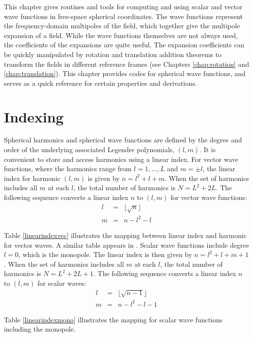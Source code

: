 

This chapter gives routines and tools for computing and using scalar and vector wave functions in free-space spherical coordinates. The wave functions represent the frequency-domain multipoles of the field, which together give the multipole expansion of a field. While the wave functions themselves are not always used, the coefficients of the expansions are quite useful. The expansion coefficients can be quickly manipulated by rotation and translation addition theorems to transform the fields in different reference frames (see Chapters \ref{chap:rotation} and \ref{chap:translation}). This chapter provides codes for spherical wave functions, and serves as a quick reference for certain properties and derivations. 

\section{Indexing}

Spherical harmonics and spherical wave functions are defined by the degree and order of the underlying associated Legendre polynomials, $(l,m)$. It is convenient to store and access harmonics using a linear index. For vector wave functions, where the harmonics range from $l = 1,...,L$ and $m = \pm l$, the linear index for harmonic $(l,m)$ is given by $n = l^2 + l + m$. When the set of harmonics includes all $m$ at each $l$, the total number of harmonics is $N = L^2 + 2L$. The following sequence converts a linear index $n$ to $(l,m)$ for vector wave functions:
\begin{eqnarray}
l &=& \lfloor \sqrt{n} \rfloor \\
m &=& n - l^2 - l
\end{eqnarray}

Table \ref{linearindexvec} illustrates the mapping between linear index and harmonic for vector waves. A similar table appears in \cite{tsang2000scattering}.  Scalar wave functions include degree $l=0$, which is the monopole. The linear index is then given by $n = l^2 + l + m + 1$.  When the set of harmonics includes all $m$ at each $l$, the total number of harmonics is $N = L^2 + 2L + 1$.  The following sequence converts a linear index $n$ to $(l,m)$ for scalar waves:
\begin{eqnarray}
l &=& \lfloor \sqrt{n-1} \rfloor \\
m &=& n - l^2 - l -1
\end{eqnarray}

Table \ref{linearindexmono} illustrates the mapping for scalar wave functions including the monopole.  


